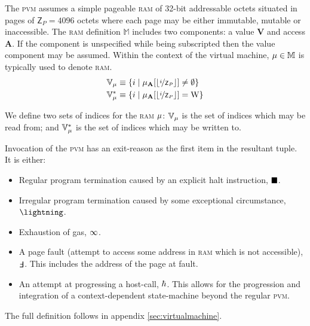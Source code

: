 The \textsc{pvm} assumes a simple pageable \textsc{ram} of 32-bit addressable octets situated in pages of $\mathsf{Z}_P = 4096$ octets where each page may be either immutable, mutable or inaccessible. The \textsc{ram} definition $\mathbb{M}$ includes two components: a value $\mathbf{V}$ and access $\mathbf{A}$. If the component is unspecified while being subscripted then the value component may be assumed. Within the context of the virtual machine, $\mu \in \mathbb{M}$ is typically used to denote \textsc{ram}.
\begin{align}
  \mathbb{V}_{\memory} &\equiv \{i \mid \memory_\mathbf{A}[\floor{\nicefrac{i}{\mathsf{Z}_P}}] \ne \none \} \\
  \mathbb{V}^*_{\memory} &\equiv \{i \mid \memory_\mathbf{A}[\floor{\nicefrac{i}{\mathsf{Z}_P}}] = \text{W} \}
\end{align}

We define two sets of indices for the \textsc{ram} $\mu$: $\mathbb{V}_{\mu}$ is the set of indices which may be read from; and $\mathbb{V}^*_{\mu}$ is the set of indices which may be written to.

Invocation of the \textsc{pvm} has an exit-reason as the first item in the resultant tuple. It is either:
\begin{itemize}
  \item Regular program termination caused by an explicit halt instruction, $\blacksquare$.
  \item Irregular program termination caused by some exceptional circumstance, $\panic$.
  \item Exhaustion of gas, $\infty$.
  \item A page fault (attempt to access some address in \textsc{ram} which is not accessible), $\fault$. This includes the address of the page at fault.
  \item An attempt at progressing a host-call, $\hbar$. This allows for the progression and integration of a context-dependent state-machine beyond the regular \textsc{pvm}.
\end{itemize}

The full definition follows in appendix \ref{sec:virtualmachine}.

















